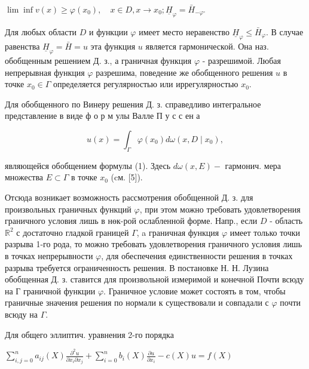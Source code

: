 \documentclass[10pt]{article}
\begin{document}
$\lim \inf v(x) \geqslant \varphi\left(x_{0}\right), \quad x \in D, x \rightarrow x_{0} ; \underline{H}_{\varphi}=\bar{H}_{-\varphi^{\circ}}$



Для любых области $D$ и функции $\varphi$ имеет место неравенство $\underline{H}_{\varphi} \leqslant \bar{H}_{\varphi}$. В случае равенства $\underline{H}_{\varphi}=\bar{H}=u$ эта функция $u$ является гармонической. Она наз. обобщенным решением Д. з., а граничная функция $\varphi$ - разрешимой. Любая непрерывная функция $\varphi$ разрешима, поведение же обобщенного решения $u$ в точке $x_{0} \in \Gamma$ определяется регулярностью или иррегулярностью $x_{0}$.



Для обобщенного по Винеру решения Д. з. справедливо интегральное представление в виде ф о р м улы Валле П у с с ен а



\[

u(x)=\int_{\Gamma} \varphi\left(x_{0}\right) d \omega\left(x, D \mid x_{0}\right),

\]



являющейся обобщением формулы (1). Здесь $d \omega(x, E)-$ гармонич. мера множества $E \subset \Gamma$ в точке $x_{0}$ (cм. [5]).



Отсюда возникает возможность рассмотрения обобщенной Д. з. для произвольных граничных функций $\varphi$, при этом можно требовать удовлетворения граничного условия лишь в нөк-рой ослабленной форме. Напр., если $D$ - область $\mathbb{R}^{2}$ с достаточно гладкой границей $\Gamma$, a граничная функция $\varphi$ имеет только точки разрыва 1-го рода, то можно требовать удовлетворения граничного условия лишь в точках непрерывности $\varphi$, для обеспечения единственности решения в точках разрыва требуется ограниченность решения. В постановке Н. Н. Лузина обобщенная Д. з. ставится для произвольной измеримой и конечной Почти всюду на Г граничной функции $\varphi$. Граничное условие может состоять в том, чтобы граничные значения решения по нормали к существовали и совпадали с $\varphi$ почти всюду на $\Gamma$.



Для общего эллиптич. уравнения 2-го порядка



$\sum_{i, j=0}^{n} a_{i j}(X) \frac{\partial^{2} u}{\partial x_{i} \partial x_{j}}+\sum_{i=0}^{n} b_{i}(X) \frac{\partial u}{\partial x_{i}}-c(X) u=f(X)$
\end{document}
